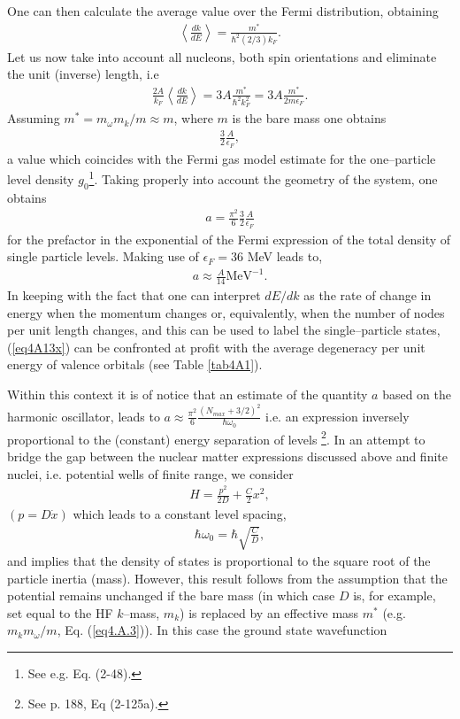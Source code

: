 \begin{subappendices}
One can then calculate the average value over the Fermi distribution, obtaining
\begin{align}
\left\langle\frac{dk}{dE}\right\rangle=\frac{m^*}{\hbar^2(2/3)k_F}.
\end{align}
 Let us now take into account all nucleons, both spin orientations and eliminate the unit (inverse) length, i.e
\begin{align}
\frac{2A}{k_F}\left\langle\frac{dk}{dE}\right\rangle=3A\frac{m^*}{\hbar^2k_F^2}=3A\frac{m^*}{2m\epsilon_F}.
\end{align}
Assuming $m^*=m_\omega m_k/m\approx m$, where $m$ is the bare mass one obtains
\begin{align}
\frac{3}{2}\frac{A}{\epsilon_F},
\end{align}
a value which coincides with the Fermi gas model estimate for the one--particle level density $g_0$\footnote{See e.g. \cite{Bohr:69} Eq. (2-48).}. Taking properly into account the geometry of the system, one obtains
\begin{align}\label{eq4A13}
a=\frac{\pi^2}{6}\frac{3}{2}\frac{A}{\epsilon_F}
\end{align}
for the prefactor in the exponential of the Fermi expression of the total density of single particle levels. Making use of $\epsilon_F=36$ MeV leads to,
\begin{align}\label{eq4A13x}
a\approx\frac{A}{14}\text{MeV}^{-1}.
\end{align}
In keeping with the fact that one can interpret $dE/dk$ as the rate of change in energy when the momentum changes or, equivalently, when the number of nodes per unit length changes, and this can be used to label the single--particle states, (\ref{eq4A13x}) can be confronted at profit with the average degeneracy per unit energy of valence orbitals (see Table \ref{tab4A1}). 



Within this context it is of notice that an estimate of the quantity $a$ based on the harmonic oscillator, leads to $a\approx\frac{\pi^2}{6}\frac{(N_{max}+3/2)^2}{\hbar\omega_0}$ i.e. an expression inversely proportional to the (constant) energy separation of levels \footnote{See \cite{Bohr:69} p. 188, Eq (2-125a).}. In an attempt to bridge the gap between the nuclear matter expressions discussed above and finite nuclei, i.e. potential wells of finite range, we consider
\begin{align}\label{eq4A14}
H=\frac{p^2}{2D}+\frac{C}{2}x^2,
\end{align}
$(p=D\dot x)$ which leads to a constant level spacing,
\begin{align}
\hbar\omega_0=\hbar\sqrt{\frac{C}{D}},
\end{align}
 and implies that the density of states is proportional to the square root of the particle inertia (mass). However, this result follows from the assumption that the potential remains unchanged if the bare mass (in which case $D$ is, for example, set equal to the HF $k$--mass, $m_k$) is replaced by an effective mass $m^*$ (e.g. $m_km_\omega/m$, Eq. (\ref{eq4.A.3})). In this case the ground state wavefunction
 

\end{subappendices}
